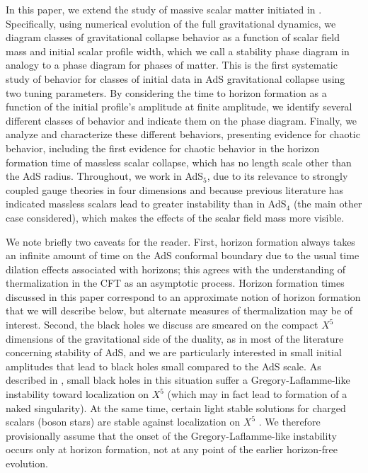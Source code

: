\documentclass[../PhD.tex]{subfiles}
\begin{document}
In this paper, we extend the study of massive scalar matter initiated in
\cite{1504.05203,1508.02709}.  Specifically, using numerical evolution of
the full gravitational dynamics, we diagram classes of gravitational
collapse behavior as a function of scalar field mass and initial scalar profile
width, which we call a stability phase diagram 
in analogy to a phase diagram for phases of matter.  
This is the first systematic study of behavior for classes of initial data
in AdS gravitational collapse using two tuning parameters.
By considering the time to horizon formation as a function of
the initial profile's amplitude at finite amplitude, 
we identify several different classes
of behavior and indicate them on the phase diagram.  Finally, we
analyze and characterize these different behaviors, presenting evidence for
chaotic behavior, including the first evidence for chaotic behavior in
the horizon formation time of
massless scalar collapse, which has no length scale other than the AdS
radius.  Throughout,
we work in AdS$_5$, due to its relevance to strongly coupled gauge theories
in four dimensions and because previous literature has indicated massless
scalars lead to greater instability than in AdS$_4$ (the main other case
considered), which makes the effects of the scalar field mass more visible.

We note briefly two caveats for the reader.  First, horizon formation
always takes an infinite amount of time on the AdS conformal boundary
due to the usual time dilation effects associated with horizons; this agrees
with the understanding of thermalization in the CFT as an asymptotic process.
Horizon formation times discussed in this paper correspond to an approximate
notion of horizon formation that we will describe below, but alternate
measures of thermalization may be of interest.  Second, the black holes
we discuss are smeared on the compact $X^5$ dimensions of the gravitational
side of the duality, as in most of the literature concerning stability of
AdS, and we are particularly interested in small initial amplitudes that
lead to black holes small compared to the AdS scale. As described in
\cite{hep-th/0202189,1502.01574,1509.07780}, small black holes in this
situation suffer a Gregory-Laflamme-like instability toward localization
on $X^5$ (which may in fact lead to formation of a naked singularity).  At
the same time, certain light stable solutions for charged scalars (boson
stars) are stable against localization on $X^5$ \cite{1509.00774}.  We
therefore provisionally assume that the onset of the Gregory-Laflamme-like
instability occurs only at horizon formation, not at any point of the
earlier horizon-free evolution.
\end{document}
